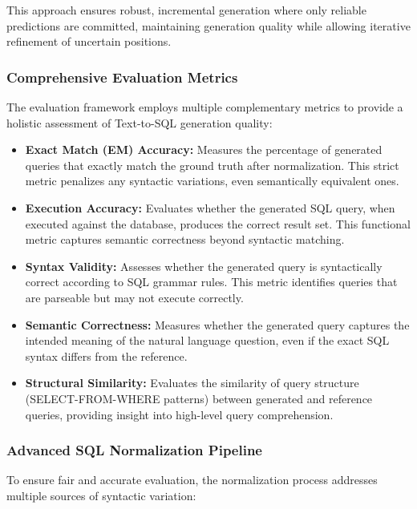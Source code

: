 \documentclass[a4paper,12pt]{article}
\begin{document}
This approach ensures robust, incremental generation where only reliable predictions are committed, maintaining generation quality while allowing iterative refinement of uncertain positions.

\subsubsection*{Comprehensive Evaluation Metrics}
The evaluation framework employs multiple complementary metrics to provide a holistic assessment of Text-to-SQL generation quality:

\begin{itemize}
    \item \textbf{Exact Match (EM) Accuracy:} Measures the percentage of generated queries that exactly match the ground truth after normalization. This strict metric penalizes any syntactic variations, even semantically equivalent ones.
    
    \item \textbf{Execution Accuracy:} Evaluates whether the generated SQL query, when executed against the database, produces the correct result set. This functional metric captures semantic correctness beyond syntactic matching.
    
    \item \textbf{Syntax Validity:} Assesses whether the generated query is syntactically correct according to SQL grammar rules. This metric identifies queries that are parseable but may not execute correctly.
    
    \item \textbf{Semantic Correctness:} Measures whether the generated query captures the intended meaning of the natural language question, even if the exact SQL syntax differs from the reference.
    
    \item \textbf{Structural Similarity:} Evaluates the similarity of query structure (SELECT-FROM-WHERE patterns) between generated and reference queries, providing insight into high-level query comprehension.
\end{itemize}

\subsubsection*{Advanced SQL Normalization Pipeline}
To ensure fair and accurate evaluation, the normalization process addresses multiple sources of syntactic variation:
\end{document}
